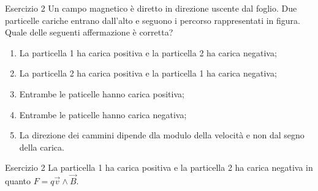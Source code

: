 \documentclass[a4paper]{article}
\begin{document}
\begin{snippetexercise}{Esercizio 2}
    Un campo magnetico è diretto in direzione uscente dal foglio.
    Due particelle cariche entrano dall'alto e seguono i percorso rappresentati in figura.
    Quale delle seguenti affermazione è corretta?
    \begin{center}
    \end{center}
    \begin{enumerate}[label=\Alph*, nosep]
        \item La particella 1 ha carica positiva e la particella 2 ha carica negativa;
        \item La particella 2 ha carica positiva e la particella 1 ha carica negativa;
        \item Entrambe le paticelle hanno carica positiva;
        \item Entrambe le paticelle hanno carica negativa;
        \item La direzione dei cammini dipende dla modulo della velocità e non dal segno della carica.
    \end{enumerate}
\end{snippetexercise}
\begin{snippetsolution}{Esercizio 2}
    La particella 1 ha carica positiva e la particella 2 ha carica negativa
    in quanto \(F = q\vec{v} \wedge \vec B\).
\end{snippetsolution}
\end{document}
